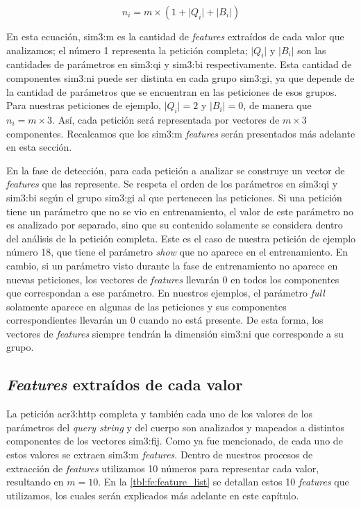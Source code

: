 \begin{equation}
    \label{eq:fe:number_of_features}
    n_{i}
    =
    m
    \times
    \left(
        1 + \lvert Q_{i} \rvert + \lvert B_{i} \rvert
    \right)
\end{equation}

En esta ecuación, \gls{sim3:m} es la cantidad de \textit{features}
extraídos de cada valor que analizamos; el número 1 representa la petición
completa; $\lvert Q_{i} \rvert$ y $\lvert B_{i} \rvert$ son las cantidades
de parámetros en \gls{sim3:qi} y \gls{sim3:bi} respectivamente. Esta
cantidad de componentes \gls{sim3:ni} puede ser distinta en cada grupo
\gls{sim3:gi}, ya que depende de la cantidad de parámetros que se
encuentran en las peticiones de esos grupos.
Para nuestras peticiones de ejemplo, $\lvert Q_{i} \rvert = 2$ y
$\lvert B_{i} \rvert = 0$, de manera que $n_{i} = m \times 3$. Así,
cada petición será representada por vectores de $m \times 3$ componentes.
Recalcamos que los \gls{sim3:m} \textit{features} serán presentados más
adelante en esta sección.

En la fase de detección, para cada petición a analizar se construye un
vector de \textit{features} que las represente. Se respeta el orden
de los parámetros en \gls{sim3:qi} y \gls{sim3:bi} según el grupo
\gls{sim3:gi} al que pertenecen las peticiones. Si una petición tiene
un parámetro que no se vio en entrenamiento, el valor de este parámetro
no es analizado por separado, sino que su contenido solamente se considera
dentro del análisis de la petición completa. Este es el caso de nuestra
petición de ejemplo número 18, que tiene el parámetro \textit{show} que
no aparece en el entrenamiento.
En cambio, si un parámetro visto durante la fase de entrenamiento no
aparece en nuevas peticiones, los vectores de \textit{features} llevarán
0 en todos los componentes que correspondan a ese parámetro. En nuestros
ejemplos, el parámetro \textit{full} solamente aparece en algunas de
las peticiones y sus componentes correspondientes llevarán un 0 cuando
no está presente.
De esta forma, los vectores de \textit{features} siempre tendrán la
dimensión \gls{sim3:ni} que corresponde a su grupo.


\subsection{\textit{Features} extraídos de cada valor}

La petición \gls{acr3:http} completa y también cada uno de los valores de
los parámetros del \textit{query string} y del cuerpo son analizados y
mapeados a distintos componentes de los vectores \gls{sim3:fij}. Como
ya fue mencionado, de cada uno de estos valores se extraen \gls{sim3:m}
\textit{features}.
Dentro de nuestros procesos de extracción de \textit{features} utilizamos
10 números para representar cada valor, resultando en $m = 10$. En la
\autoref{tbl:fe:feature_list} se detallan estos 10 \textit{features}
que utilizamos, los cuales serán explicados más adelante en este capítulo.

